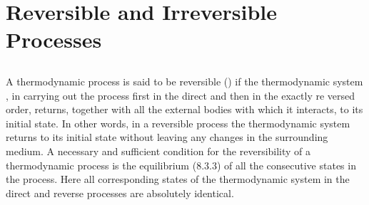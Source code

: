 \section{Reversible and Irreversible Processes}
\label{sec-11.2}

\subsection{}\label{11.2.1} A thermodynamic process is said to be reversible () if the thermodynamic system , in carrying out the process first in the direct and then in the exactly re­ versed order, returns, together with all the external bodies with which it interacts, to its initial state. In other words, in a rever­sible process the thermodynamic system returns to its initial state without leaving any changes in the surrounding medium. A necessary and sufficient condition for the reversibility of a thermodynamic process is the equilibrium (8.3.3) of all the consecutive states in the process. Here all corresponding states of the thermodynamic system in the direct and reverse pro­cesses are absolutely identical.

